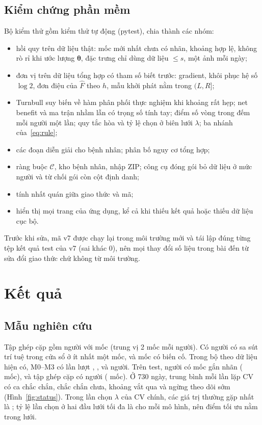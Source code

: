 \documentclass[journal]{IEEEtran}
\begin{document}
\subsection{Kiểm chứng phần mềm}
Bộ kiểm thử gồm  kiểm thử tự động (pytest), chia thành các nhóm:
\begin{itemize}
\item hồi quy trên dữ liệu thật: mốc mới nhất chưa có nhãn, khoảng hợp lệ, không rò rỉ khi ước lượng $\bm\theta$, đặc trưng chỉ dùng dữ liệu $\le s$, một ảnh mỗi ngày;
\item đơn vị trên dữ liệu tổng hợp có tham số biết trước: gradient, khôi phục hệ số $\log 2$, đơn điệu của $\hat F$ theo $h$, mẫu khởi phát nằm trong $(L,R]$;
\item Turnbull suy biến về hàm phân phối thực nghiệm khi khoảng rất hẹp; net benefit và ma trận nhầm lẫn có trọng số tính tay; điểm số vòng trong đếm mỗi người một lần; quy tắc hòa và tỷ lệ chọn ở biên lưới $\lambda$; ba nhánh của~\eqref{eq:rule};
\item các đoạn diễn giải cho bệnh nhân; phân bố nguy cơ tổng hợp;
\item ràng buộc $\mathcal C$, kho bệnh nhân, nhập ZIP; công cụ đóng gói bỏ dữ liệu ở mức người và từ chối gói còn cột định danh;
\item tính nhất quán giữa giao thức và mã;
\item hiển thị mọi trang của ứng dụng, kể cả khi thiếu kết quả hoặc thiếu dữ liệu cục bộ.
\end{itemize}
Trước khi sửa, mã v7 được chạy lại trong môi trường mới và tái lập đúng từng tệp kết quả test của v7 (sai khác 0), nên mọi thay đổi số liệu trong bài đến từ sửa đổi giao thức chứ không từ môi trường.

\section{Kết quả}\label{sec:results}
\subsection{Mẫu nghiên cứu}
Tập ghép cặp gồm  người với  mốc (trung vị 2 mốc mỗi người). Có  người có sa sút trí tuệ trong cửa sổ ở ít nhất một mốc, và  mốc có biến cố. Trong bộ theo dữ liệu hiện có, M0--M3 có lần lượt , ,  và  người. Trên test,  người có mốc gắn nhãn ( mốc), và tập ghép cặp có  người ( mốc). Ở 730 ngày, trung bình mỗi lần lặp CV có  ca chắc chắn,  chắc chắn chưa,  khoảng vắt qua và  ngừng theo dõi sớm (Hình~\ref{fig:status}). Trong  lần chọn $\lambda$ của CV chính, các giá trị thường gặp nhất là ; tỷ lệ lần chọn ở hai đầu lưới tối đa là  cho mỗi mô hình, nên điểm tối ưu nằm trong lưới.
\end{document}
